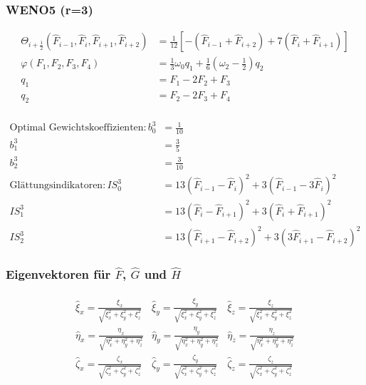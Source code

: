 \subsubsection{WENO5 (r=3)}
\begin{align*}
\Theta_{i+\frac{1}{2}} \left(\hat{F}_{i-1},\hat{F}_{i},\hat{F}_{i+1},\hat{F}_{i+2}\right)&=
\frac{1}{12}
\left[
-\left(\hat{F}_{i-1}+\hat{F}_{i+2} \right)
+7\left(\hat{F}_{i}+\hat{F}_{i+1} \right)
\right]
\\
\varphi \left( F_1,F_2,F_3,F_4\right) &=
\frac{1}{3}\omega_0 q_1+
\frac{1}{6} \left(\omega_2 -\frac{1}{2}\right) q_2
\\
q_1&=F_1-2F_2+F_3\\ 
q_2&=F_2-2F_3+F_4\\ 
\end{align*}

\begin{align*}
\text{Optimal Gewichtskoeffizienten}:
b_0^3 &= \frac{1}{10}
\\
b_1^3 &= \frac{3}{5}
\\
b_2^3 &= \frac{3}{10}
\\
\text{Glättungsindikatoren}:
IS^3_0 &= 13 \left(\hat{F}_{i-1}-\hat{F}_{i}\right)^2 + 3 \left(\hat{F}_{i-1}-3\hat{F}_{i}\right)^2
\\
IS^3_1 &= 13 \left(\hat{F}_{i}-\hat{F}_{i+1}\right)^2 + 3 \left(\hat{F}_{i}+\hat{F}_{i+1}\right)^2
\\
IS^3_2 &= 13 \left(\hat{F}_{i+1}-\hat{F}_{i+2}\right)^2 + 3 \left(3\hat{F}_{i+1}-\hat{F}_{i+2}\right)^2
\end{align*}

\subsubsection{Eigenvektoren für $\hat{F}$, $\hat{G}$ und $\hat{H}$}
\begin{align*}
\begin{matrix}
\hat{\xi}_x=\frac{\xi_x}{\sqrt{\xi_x^2+\xi_y^2+\xi_z^2}}
&
\hat{\xi}_y=\frac{\xi_y}{\sqrt{\xi_x^2+\xi_y^2+\xi_z^2}}
&
\hat{\xi}_z=\frac{\xi_z}{\sqrt{\xi_x^2+\xi_y^2+\xi_z^2}}
\\
\hat{\eta}_x=\frac{\eta_x}{\sqrt{\eta_x^2+\eta_y^2+\eta_z^2}}
&
\hat{\eta}_y=\frac{\eta_y}{\sqrt{\eta_x^2+\eta_y^2+\eta_z^2}}
&
\hat{\eta}_z=\frac{\eta_z}{\sqrt{\eta_x^2+\eta_y^2+\eta_z^2}}
\\
\hat{\zeta}_x=\frac{\zeta_x}{\sqrt{\zeta_x^2+\zeta_y^2+\zeta_z^2}}
&
\hat{\zeta}_y=\frac{\zeta_y}{\sqrt{\zeta_x^2+\zeta_y^2+\zeta_z^2}}
&
\hat{\zeta}_z=\frac{\zeta_z}{\sqrt{\zeta_x^2+\zeta_y^2+\zeta_z^2}}
\end{matrix}
\end{align*}

